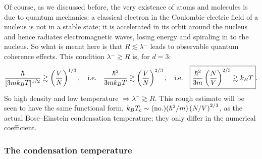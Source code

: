 Of course, as we discussed before, the very existence of atoms and molecules is due to quantum mechanics: a classical electron in
the Coulombic electric field of a nucleus is not in a stable state; it is accelerated in its orbit around the nucleus and hence
radiates electromagnetic waves, losing energy and spiraling in to the nucleus. So what is meant here is that
$R\lesssim\lambda\!\!\!^-$ leads to observable quantum coherence effects. This condition $\lambda\!\!\!^-\gtrsim R$ is, for
$d = 3$:
\begin{equation}
  \frac{\hbar}{[3mk_{B} T]^{1/2}}\gtrsim\left(\frac{V}{N}\right)^{1/3},\quad\text{i.e.}\quad
  \frac{\hbar^2}{3mk_{B} T}\gtrsim\left(\frac{V}{N}\right)^{2/3},\quad\text{i.e.}\quad
  \boxed{\frac{\hbar^2}{3m}\left(\frac{N}{V}\right)^{2/3}\gtrsim k_{B} T}.
\end{equation}
So high density and low temperature $\Rightarrow\lambda\!\!\!^-\gtrsim R$. This rough estimate will be seen to have the same
functional form, $k_{B} T_c\sim(\text{no.})(\hbar^2/m)\left(N/V\right)^{2/3}$, as the actual Bose--Einstein condensation
temperature; they only differ in the numerical coefficient.

\subsubsection*{The condensation temperature}

